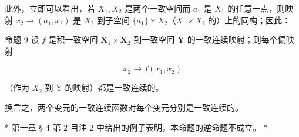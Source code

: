 此外，立即可以看出，若 \(X_{1}, X_{2}\) 是两个一致空间而 \(a_{1}\) 是 \(X_{1}\) 的任意一点，则映射 \(x_{2} \to (a_{1}, x_{2})\) 是 \(X_{2}\) 到子空间 \(\{a_{1}\} \times X_{2}\)（\(X_{1} \times X_{2}\) 的）上的同构；因此：

命题 9 设 \(f\) 是积一致空间 \(\mathbf{X}_1 \times \mathbf{X}_2\) 到一致空间 \(\mathbf{Y}\) 的一致连续映射；则每个偏映射

\[
x _ {2} \rightarrow f (x _ {1}, x _ {2})
\]

（作为 \(X_{2}\) 到 Y 的映射）都是一致连续的。

换言之，两个变元的一致连续函数对每个变元分别是一致连续的。

* 第一章 § 4 第 2 目注 2 中给出的例子表明，本命题的逆命题不成立。 *

